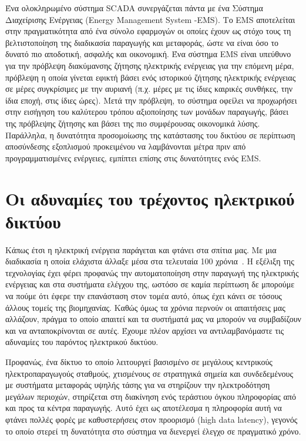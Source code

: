 \documentclass[12pt, a4paper, oneside]{report}
\begin{document}
Ένα ολοκληρωμένο σύστημα SCADA συνεργάζεται πάντα με ένα Σύστημα Διαχείρισης Ενέργειας (Energy Management System -EMS)\cite{9}. Το EMS αποτελείται στην πραγματικότητα από ένα σύνολο εφαρμογών οι οποίες έχουν ως στόχο τους τη βελτιστοποίηση της διαδικασία παραγωγής και μεταφοράς, ώστε να είναι όσο το δυνατό πιο αποδοτική, ασφαλής και οικονομική. Ένα σύστημα EMS είναι υπεύθυνο για την πρόβλεψη διακύμανσης ζήτησης ηλεκτρικής ενέργειας για την επόμενη μέρα, πρόβλεψη η οποία γίνεται εφικτή βάσει ενός ιστορικού ζήτησης ηλεκτρικής ενέργειας σε μέρες συγκρίσιμες με την αυριανή (π.χ. μέρες με τις ίδιες καιρικές συνθήκες, την ίδια εποχή, στις ίδιες ώρες). Μετά την πρόβλεψη, το σύστημα οφείλει να προχωρήσει στην εισήγηση του καλύτερου τρόπου αξιοποίησης των μονάδων παραγωγής, βάσει της πρόβλεψης ζήτησης και βάσει της πιο συμφέρουσας οικονομικά λύσης. Παράλληλα, η δυνατότητα προσομοίωσης της κατάστασης του δικτύου σε περίπτωση αποσύνδεσης εξοπλισμού προκειμένου να λαμβάνονται μέτρα πριν από προγραμματισμένες ενέργειες, εμπίπτει επίσης στις δυνατότητες ενός EMS.

\section{Οι αδυναμίες του τρέχοντος ηλεκτρικού δικτύου}

Κάπως έτσι η ηλεκτρική ενέργεια παράγεται και φτάνει στα σπίτια μας. Με μια διαδικασία η οποία ελάχιστα άλλαξε μέσα στα τελευταία 100 χρόνια~\cite{4}. Η εξέλιξη της τεχνολογίας έχει φέρει προφανώς την αυτοματοποίηση στην παραγωγή της ηλεκτρικής ενέργειας και στα συστήματα ελέγχου της, ωστόσο σε καμία περίπτωση δε μπορούμε να πούμε ότι έφερε την επανάσταση στον τομέα αυτό, όπως έχει κάνει σε τόσους άλλους τομείς της βιομηχανίας. Καθώς όμως τα χρόνια περνούν οι απαιτήσεις μας αλλάζουν, πράγμα το οποίο απαιτεί και τα συστήματά μας να μπορούν να συμβαδίζουν και να ανταποκρίνονται σε αυτές. Έχουμε πλέον αρχίσει να αντιλαμβανόμαστε τις αδυναμίες του παρόντος ηλεκτρικού δικτύου.

Προφανώς, ένα δίκτυο το οποίο λειτουργεί βασισμένο σε μεγάλους κεντρικούς ηλεκτροπαραγωγούς σταθμούς, χτισμένους σε στρατηγικά σημεία και συνδεδεμένους με συστήματα μεταφοράς υψηλής τάσης για να στηρίζουν την ηλεκτροδότηση μεγάλων περιοχών, στηρίζεται στη διακίνηση ενός τεράστιου όγκου πληροφορίας από και προς τα κέντρα παραγωγής. Αυτό έχει ως αποτέλεσμα η πληροφορία αυτή να φτάνει πολλές φορές με καθυστερήσεις στον προορισμό (high data latency), γεγονός το οποίο στερεί τη δυνατότητα στο σύστημα να διενεργεί έλεγχο σε πραγματικό χρόνο.
\end{document}
